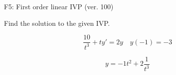 \begin{exercise}
  \begin{exerciseTitle}F5: First order linear IVP (ver. 100)\end{exerciseTitle}
  \begin{exerciseStatement}
    
Find the solution to the given IVP.

    
\[\frac{10}{t^{3}} +ty'= 2 y \hspace{1em} y( -1 ) = -3\]

  \end{exerciseStatement}
  \begin{exerciseAnswer}
    
\[y= -1 t^ 2 +2 \frac{1}{t^{3}}\]

  \end{exerciseAnswer}
\end{exercise}